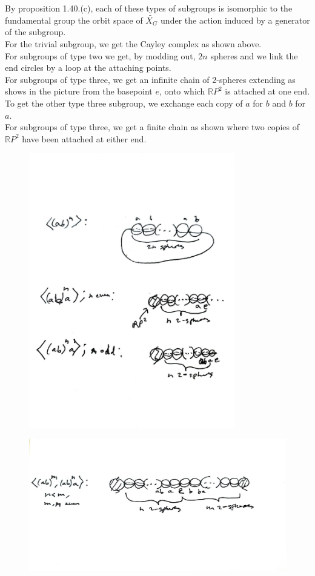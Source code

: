 \documentclass[a4paper]{article}
\begin{document}
By proposition 1.40.(c), each of these types of
subgroups is isomorphic to the fundamental group the orbit
space
of $\tilde{X_G}$ under the action induced by a generator of the subgroup.\\
\linebreak
For the trivial subgroup, we get the Cayley complex as shown above.\\
\linebreak
For subgroups of type two we get, by modding out,
$2n$ spheres and we link the end circles by a loop at the attaching points.\\
\linebreak
For subgroups of type three, we get an infinite chain of 2-spheres extending
as shows in the picture from the basepoint $e$, onto which $\mathbb{R}P^2$ is
attached at one end. To get the other type three subgroup, we exchange each
copy of $a$ for $b$ and $b$ for $a$.\\
\linebreak
For subgroups of type three, we get a finite chain as shown where two copies of
$\mathbb{R}P^2$ have been attached at either end. 
    


\begin{figure}[h]
    \centering
    \includegraphics[width=0.8\textwidth]{22.jpg}
    \label{fig:22-jpg}
\end{figure}

\begin{figure}[h]
    \centering
    \includegraphics[width=1\textwidth]{21.jpg}
    \label{fig:21-jpg}
\end{figure}
\end{document}
